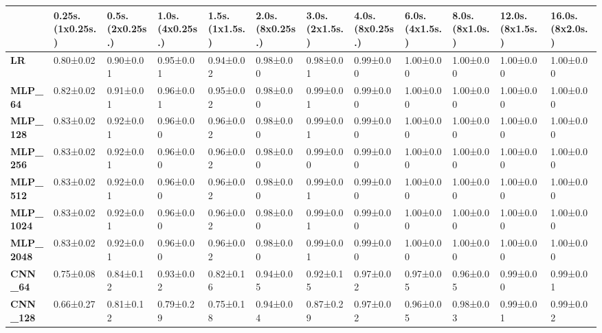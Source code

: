 \begin{tabular}{llllllllllll}
\toprule
{} & 0.25s. (1x0.25s.) & 0.5s. (2x0.25s.) & 1.0s. (4x0.25s.) & 1.5s. (1x1.5s.) & 2.0s. (8x0.25s.) & 3.0s. (2x1.5s.) & 4.0s. (8x0.25s.) & 6.0s. (4x1.5s.) & 8.0s. (8x1.0s.) & 12.0s. (8x1.5s.) & 16.0s. (8x2.0s.) \\
\midrule
\textbf{LR            } &         0.80±0.02 &        0.90±0.01 &        0.95±0.01 &       0.94±0.02 &        0.98±0.00 &       0.98±0.01 &        0.99±0.00 &       1.00±0.00 &       1.00±0.00 &        1.00±0.00 &        1.00±0.00 \\
\textbf{MLP\_64        } &         0.82±0.02 &        0.91±0.01 &        0.96±0.01 &       0.95±0.02 &        0.98±0.00 &       0.99±0.01 &        0.99±0.00 &       1.00±0.00 &       1.00±0.00 &        1.00±0.00 &        1.00±0.00 \\
\textbf{MLP\_128       } &         0.83±0.02 &        0.92±0.01 &        0.96±0.00 &       0.96±0.02 &        0.98±0.00 &       0.99±0.01 &        0.99±0.00 &       1.00±0.00 &       1.00±0.00 &        1.00±0.00 &        1.00±0.00 \\
\textbf{MLP\_256       } &         0.83±0.02 &        0.92±0.01 &        0.96±0.00 &       0.96±0.02 &        0.98±0.00 &       0.99±0.00 &        0.99±0.00 &       1.00±0.00 &       1.00±0.00 &        1.00±0.00 &        1.00±0.00 \\
\textbf{MLP\_512       } &         0.83±0.02 &        0.92±0.01 &        0.96±0.00 &       0.96±0.02 &        0.98±0.00 &       0.99±0.01 &        0.99±0.00 &       1.00±0.00 &       1.00±0.00 &        1.00±0.00 &        1.00±0.00 \\
\textbf{MLP\_1024      } &         0.83±0.02 &        0.92±0.01 &        0.96±0.00 &       0.96±0.02 &        0.98±0.00 &       0.99±0.01 &        0.99±0.00 &       1.00±0.00 &       1.00±0.00 &        1.00±0.00 &        1.00±0.00 \\
\textbf{MLP\_2048      } &         0.83±0.02 &        0.92±0.01 &        0.96±0.00 &       0.96±0.02 &        0.98±0.00 &       0.99±0.01 &        0.99±0.00 &       1.00±0.00 &       1.00±0.00 &        1.00±0.00 &        1.00±0.00 \\
\textbf{CNN\_64        } &         0.75±0.08 &        0.84±0.12 &        0.93±0.02 &       0.82±0.16 &        0.94±0.05 &       0.92±0.15 &        0.97±0.02 &       0.97±0.05 &       0.96±0.05 &        0.99±0.00 &        0.99±0.01 \\
\textbf{CNN\_128       } &         0.66±0.27 &        0.81±0.12 &        0.79±0.29 &       0.75±0.18 &        0.94±0.04 &       0.87±0.29 &        0.97±0.02 &       0.96±0.05 &       0.98±0.03 &        0.99±0.01 &        0.99±0.02 \\

\end{tabular}
